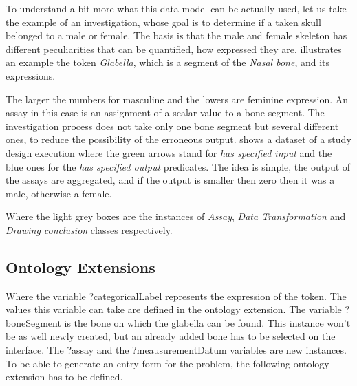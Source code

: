 

To understand a bit more what this data model can be actually used, let us take the example of an investigation, whose goal is to determine if a taken skull belonged to a male or female. The basis is that the male and female skeleton has different peculiarities that can be quantified, how expressed they are.  illustrates an example the token \textit{Glabella}, which is a segment of the \textit{Nasal bone}, and its expressions.  



The larger the numbers for masculine and the lowers are feminine expression. An assay in this case is an assignment of a scalar value to a bone segment. The investigation process does not take only one bone segment but several different ones, to reduce the possibility of the erroneous output.  shows a dataset of a study design execution where the green arrows stand for \textit{has specified input} and the blue ones for the \textit{has specified output} predicates. The idea is simple, the output of the assays are aggregated, and if the output is smaller then zero then it was a male, otherwise a female.



Where the light grey boxes are the instances of \textit{Assay}, \textit{Data Transformation} and \textit{Drawing conclusion} classes respectively.


\subsection{Ontology Extensions} \label{333}



Where the variable ?categoricalLabel represents the expression of the token. The values this variable can take are defined in the ontology extension. The variable ?boneSegment is the bone on which the glabella can be found. This instance won’t be as well newly created, but an already added bone has to be selected on the interface. The ?assay and the ?meausurementDatum variables are new instances.  To be able to generate an entry form for the problem, the following ontology extension has to be defined.



